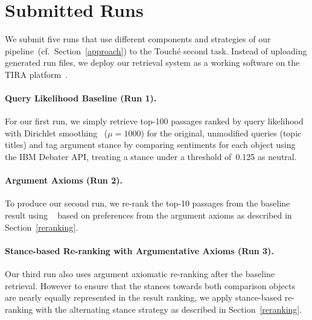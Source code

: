 \section{Submitted Runs}
\label{runs}


We submit five runs that use different components and strategies of our pipeline~(cf.\ Section~\ref{approach}) to the Touch{\'e} second task.
Instead of uploading generated run files, we deploy our retrieval system as a working software on the TIRA platform~\cite{PotthastGWS2019}.

\paragraph{Query Likelihood Baseline (Run 1).}

For our first run, we simply retrieve top-100 passages ranked by query likelihood with Dirichlet smoothing~\cite{ZhaiL2001} (\(\mu = 1000\)) for the original, unmodified queries (topic titles) and tag argument stance by comparing sentiments for each object using the IBM Debater API, treating a stance under a threshold of~0.125 as neutral.

\paragraph{Argument Axioms (Run 2).}

To produce our second run, we re-rank the top-10 passages from the baseline result using \KwikSort~\cite{BondarenkoFRSVH2022,HagenVGS2016} based on preferences from the argument axioms as described in Section~\ref{reranking}.

\paragraph{Stance-based Re-ranking with Argumentative Axioms (Run 3).}

Our third run also uses argument axiomatic re-ranking after the baseline retrieval. However to ensure that the stances towards both comparison objects are nearly equally represented in the result ranking, we apply stance-based re-ranking with the alternating stance strategy as described in Section~\ref{reranking}.

